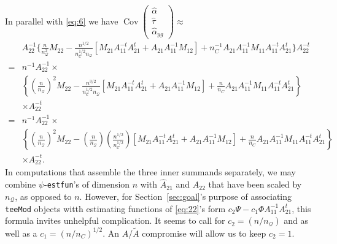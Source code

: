 \documentclass{article}
\begin{document}
  In parallel with \eqref{eq:6} we
  have $\operatorname{Cov}\left(\begin{smallmatrix}\hat\alpha \\ \hat\tau \\ \hat{\alpha}_{yg}\end{smallmatrix}\right) \approx$
  \begin{align*}
  &A_{22}^{-1}\{\frac{n}{n_{\mathcal{Q}}^{2}} M_{22} -
                                 \frac{n^{1/2}}{n_{\mathcal{C}}^{1/2}n_{\mathcal{Q}}}[M_{21}A_{11}^{-t}A_{21}^t
                                 + A_{21}A_{11}^{-1}M_{12}] +
                                 n_C^{-1}A_{21}A_{11}^{-1}M_{11}A_{11}^{-t}A_{21}^{t}\}A_{22}^{-t}\nonumber
  \\
                               =& n^{-1}A_{22}^{-1} \times\\
                                 &\left\{\left(\frac{n}{n_{\mathcal{Q}}}\right)^{2}M_{22} -
                                 \frac{n^{3/2}}{n_{\mathcal{C}}^{1/2}n_{\mathcal{Q}}}[M_{21}A_{11}^{-t}A_{21}^t
                                 + A_{21}A_{11}^{-1}M_{12}] +
                                 \frac{n}{n_C}A_{21}A_{11}^{-1}M_{11}A_{11}^{-t}A_{21}^{t}\right\}\\
    &
                                 \times A_{22}^{-t}\\
                               =& n^{-1}A_{22}^{-1} \times\\
                                 &\left\{\left(\frac{n}{n_{\mathcal{Q}}}\right)^{2}M_{22} -
                                 \left(\frac{n}{n_{\mathcal{Q}}}\right)\left(\frac{n^{1/2}}{n_{\mathcal{C}}^{1/2}}\right)[M_{21}A_{11}^{-t}A_{21}^t
                                 + A_{21}A_{11}^{-1}M_{12}] +
                                 \frac{n}{n_C}A_{21}A_{11}^{-1}M_{11}A_{11}^{-t}A_{21}^{t}\right\}\\
    &
                                 \times A_{22}^{-t}
                                .
\end{align*}
In computations that assemble the three inner summands separately, we may combine $\psi$-\texttt{estfun}'s of dimension
$n$ with $\hat{A}_{21}$ and $\hat{A}_{22}$ that have been scaled by
$n_{\mathcal{Q}}$, as opposed to $n$.  However, for Section~\ref{sec:goal}'s purpose of
associating \texttt{teeMod} objects witth estimating functions of \eqref{eq:22}'s form $c_{2}\Psi - c_{1}\Phi
A_{11}^{-1}A_{21}^{t}$, this formula invites unhelpful
complication. It seems to call for $c_{2}=({n}/{n_{\mathcal{Q}}})$
and as well as a $c_{1}=({n}/{n_C})^{1/2}$.  An $A$/$\tilde{A}$
compromise will allow us to keep $c_{2}=1$.
\end{document}
